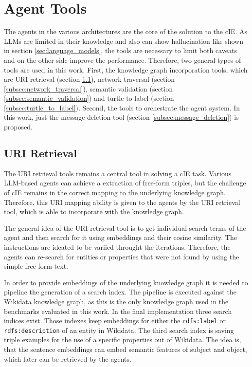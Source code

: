 \documentclass[a4paper,oneside,bibliography=totoc]{scrbook}
\begin{document}
\section{Agent Tools}
\label{sec:agent_tools}

The agents in the various architectures are the core of the solution to the \ac{cIE}. As \acp{LLM} are limited in their knowledge and also can show hallucination like shown in section \ref{sec:language_models}, the tools are necessary to limit both caveats and on the other side improve the performance. Therefore, two general types of tools are used in this work. First, the knowledge graph incorporation tools, which are URI retrieval (section \ref{subsec:uri_retrieval}), network traversal (section \ref{subsec:network_traversal}), semantic validation (section \ref{subsec:semantic_validation}) and turtle to label (section \ref{subsec:turtle_to_label}). Second, the tools to orchestrate the agent system. In this work, just the message deletion tool (section \ref{subsec:message_deletion}) is proposed.

\subsection{URI Retrieval}
\label{subsec:uri_retrieval}

The URI retrieval tools remains a central tool in solving a \ac{cIE} task. Various \ac{LLM}-based agents can achieve a extraction of free-form triples, but the challenge of \ac{cIE} remains in the correct mapping to the underlying knowledge graph. Therefore, this URI mapping ability is given to the agents by the URI retrieval tool, which is able to incorporate with the knowledge graph.

The general idea of the URI retrieval tool is to get individual search terms of the agent and then search for it using embeddings and their cosine similarity. The instructions are ideated to be variied throught the iterations. Therefore, the agents can re-search for entities or properties that were not found by using the simple free-form text.

In order to provide embeddings of the underlying knowledge graph it is needed to pipeline the generation of a search index. The pipeline is executed against the Wikidata knowledge graph, as this is the only knowledge graph used in the benchmarks evaluated in this work. In the final implementation three search indices exist. Those indexes keep embeddings for either the \texttt{rdfs:label} or \texttt{rdfs:description} of an entity in Wikidata. The third search index is saving triple examples for the use of a specific properties out of Wikidata. The idea is, that the sentence embeddings can embed semantic features of subject and object, which later can be retrieved by the agents.
\end{document}
